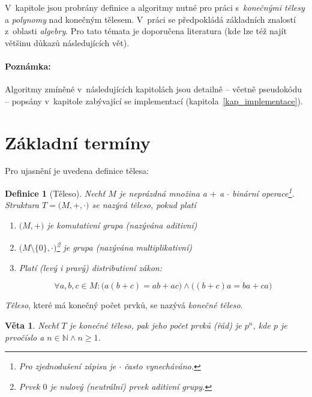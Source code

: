 \documentclass[thesis=M,czech,hidelinks]{FITthesis}[2012/06/26]
\newcommand{\0}{{\textcolor[gray]{0.80}{0}}}
\newtheorem{definice}{Definice}
\newtheorem{veta}{Věta}
\begin{document}
V~kapitole jsou probrány definice a algoritmy nutné pro práci s~\emph{konečnými
tělesy} a \emph{polynomy} nad konečným tělesem. V~práci se předpokládá
základních znalostí z~oblasti \emph{algebry}. Pro tato témata je doporučena
literatura \cite{FIT_MPI,FIT_MKY,FIT_LIN,FIT_BHW,Paar} (kde lze též najít
většinu důkazů následujících vět).

\paragraph{Poznámka:} Algoritmy zmíněné v~následujících kapitolách jsou detailně
-- včetně pseudokódu -- popsány v~kapitole zabývající se implementací
(kapitola~\ref{kap_implementace}).
\section{Základní termíny}

Pro ujasnění je uvedena definice tělesa:

\begin{definice}[Těleso]
    Nechť $M$ je neprázdná množina a $+$ a $\cdot$ binární operace\footnote{
        Pro zjednodušení zápisu je $\cdot$ často vynecháváno.
    }. Struktura
    $T=\big(M, +, \cdot \big)$ se nazývá těleso, pokud platí
    \begin{enumerate}
        \item $\big(M, +\big)$ je \emph{komutativní grupa} (nazývána
            \emph{aditivní})
        \item $\big(M\setminus\{\mathit{0}\}, \cdot \big)$\footnote{
                Prvek $\mathit{0}$ je \emph{nulový} (\emph{neutrální}) prvek
                \emph{aditivní grupy}.
            } je \emph{grupa} (nazývána
            \emph{multiplikativní})
        \item Platí (levý i pravý) \emph{distributivní zákon}:

            $$
                \forall a,b,c \in M :
                \big( a(b+c) = a b + a c \big) \land
                \big( (b+c)a = b a + c a \big)
            $$

    \end{enumerate}
\end{definice}
\emph{Těleso}, které má konečný počet prvků, se nazývá \emph{konečné těleso}.

\begin{veta}
    Nechť $T$ je \emph{konečné těleso}, pak jeho počet prvků (\emph{řád}) je
    $p^n$, kde $p$ je prvočíslo a $n \in \mathbb{N} \land n \geq 1 $.
\end{veta}
\end{document}
